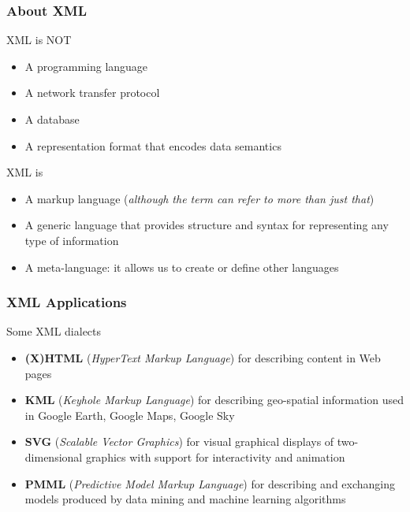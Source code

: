 \documentclass[svgnames]{beamer}
\begin{document}

\begin{frame}
\frametitle{About XML}

\begin{block}{XML is NOT}
\begin{itemize}
 \item A programming language
 \item A network transfer protocol
 \item A database
 \item A representation format that encodes data semantics
\end{itemize}
\end{block}

\begin{block}{XML is}
\begin{itemize}
 \item A markup language ({\it although the term can refer to more than just that})
 \item A generic language that provides structure and syntax for representing any type of information
 \item A meta-language: it allows us to create or define other languages
\end{itemize}
\end{block}

\end{frame}


\begin{frame}
\frametitle{XML Applications}

\begin{block}{Some XML dialects}
\begin{itemize}
  \item \textbf{(X)HTML} (\textit{HyperText Markup Language}) for describing content in Web pages
 \item \textbf{KML} (\textit{Keyhole Markup Language}) for describing geo-spatial information used in Google Earth, Google Maps, Google Sky
 \item \textbf{SVG} (\textit{Scalable Vector Graphics}) for visual graphical displays of two-dimensional graphics with support for interactivity and animation
 \item \textbf{PMML} (\textit{Predictive Model Markup Language}) for describing and exchanging models produced by data mining and machine learning algorithms
\end{itemize}
\end{block}

\end{frame}
\end{document}
